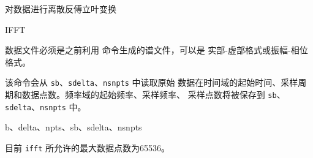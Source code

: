 \label{cmd:ifft}

对数据进行离散反傅立叶变换

\begin{SACSTX}
IFFT
\end{SACSTX}

数据文件必须是之前利用  命令生成的谱文件，可以是
实部-虚部格式或振幅-相位格式。

该命令会从 \texttt{sb}、\texttt{sdelta}、\texttt{nsnpts} 中读取原始
数据在时间域的起始时间、采样周期和数据点数。频率域的起始频率、采样频率、
采样点数将被保存到 \texttt{sb}、\texttt{sdelta}、\texttt{nsnpts} 中。

b、delta、npts、sb、sdelta、nsnpts

目前 \texttt{ifft} 所允许的最大数据点数为65536。
